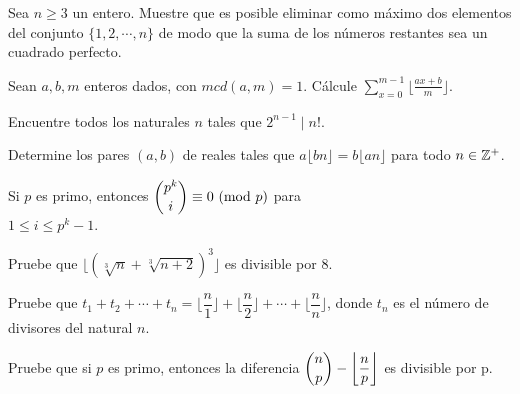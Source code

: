 \begin{pbm}
	Sea $n \geq 3$ un entero. Muestre que es posible eliminar como m\'aximo dos elementos del conjunto $\{1,2,\cdots,n\}$ de modo que la suma de los n\'umeros restantes sea un cuadrado perfecto.
\end{pbm}
\begin{pbm}
	Sean $a,b,m$ enteros dados, con $mcd(a,m) = 1$. C\'alcule $\displaystyle\sum_{x = 0}^{m - 1}\biggl\lfloor \frac{ax + b}{m} \biggr\rfloor$.
\end{pbm}
\begin{pbm}
	Encuentre todos los naturales $n$ tales que $2^{n - 1}\mid n!$.
\end{pbm}
\begin{pbm}
	Determine los pares $(a,b)$ de reales tales que $a\lfloor bn \rfloor = b\lfloor an \rfloor$ para todo $n \in \mathbb{Z}^{+}$.
\end{pbm}
\begin{pbm}
	Si $p$ es primo, entonces $\dbinom{p^{k}}{i} \equiv 0 \ (\mathrm{mod}\ p)$ para\\
	$1 \leq i \leq p^{k} - 1$.
\end{pbm}
\begin{pbm}
	Pruebe que $\lfloor(\sqrt[3]{n} + \sqrt[3]{n + 2})^{3}\rfloor$ es divisible por $8$.
\end{pbm}
\begin{pbm}
	Pruebe que $t_{1} + t_{2} + \cdots + t_{n} = \biggl\lfloor \dfrac{n}{1} \biggr\rfloor + \biggl\lfloor \dfrac{n}{2} \biggr\rfloor + \cdots + \biggl\lfloor \dfrac{n}{n} \biggr\rfloor$, donde $t_{n}$ es el n\'umero de divisores del natural $n$.
\end{pbm}
\begin{pbm}
	Pruebe que si $p$ es primo, entonces la diferencia $\dbinom{n}{p} - \biggl\lfloor \dfrac{n}{p} \biggr\rfloor$ es divisible por p.
\end{pbm}